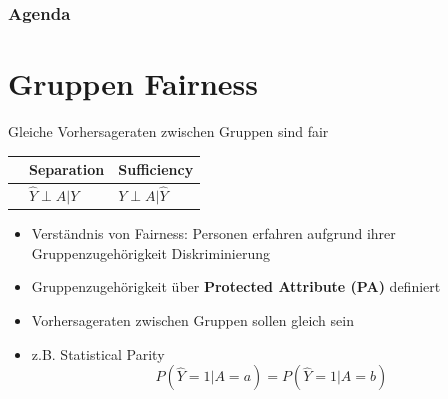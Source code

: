 \documentclass[aspectratio=169]{beamer}
\newcommand{\FirstAgendaSlide}{
  \begin{frame}[plain]
    \frametitle{Agenda}
    \setcounter{tocdepth}{1}
    \tableofcontents[sectionstyle=show/show, pausesubsections=false]
  \end{frame}
}
\begin{document}
\FirstAgendaSlide

\section{Gruppen Fairness}
\begin{frame}[t]{Gleiche Vorhersageraten zwischen Gruppen sind fair} %
	\begin{table}
        \begin{tabular}{lll}
            \toprule
            \color{orange}{Independence} & Separation & Sufficiency \\
            \midrule
            \color{orange}{$\hat{Y} \perp A$} & $\hat{Y} \perp A | Y$ & $Y \perp A | \hat{Y}$\\
            \bottomrule
        \end{tabular}
    \end{table}
	\begin{itemize}
		\item<2-> Verständnis von Fairness: Personen erfahren aufgrund ihrer Gruppenzugehörigkeit Diskriminierung
		\item<3-> Gruppenzugehörigkeit über \textbf{Protected Attribute (PA)} definiert
		\item<4-> Vorhersageraten zwischen Gruppen sollen gleich sein
		\item<6-> z.B. Statistical Parity \cite{verma2018} 	$$P(\hat{Y} = 1 | A = a) = P(\hat{Y} = 1 | A = b)$$ %
	\end{itemize}
	\vspace*{-6cm}
\end{frame}
\end{document}
